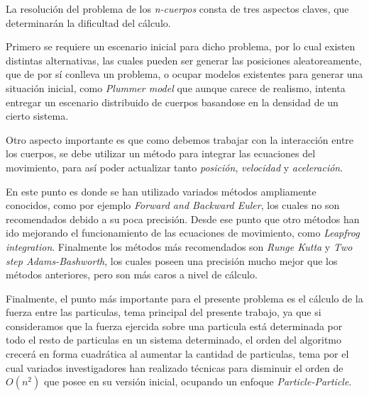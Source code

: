 
La resolución del problema de los \emph{n-cuerpos} consta de tres
aspectos claves, que determinarán la dificultad del cálculo.

Primero se requiere un escenario inicial para dicho problema,
por lo cual existen distintas alternativas, las cuales pueden ser
generar las posiciones aleatoreamente, que de por sí conlleva un problema,
o ocupar modelos existentes para generar una situación inicial,
como \emph{Plummer model} que aunque carece de realismo,
intenta entregar un escenario distribuido de cuerpos
basandose en la densidad de un cierto sistema.

Otro aspecto importante es que como debemos trabajar con la interacción
entre los cuerpos, se debe utilizar un método para integrar las ecuaciones
del movimiento, para así poder actualizar tanto \emph{posición}, \emph{velocidad}
y \emph{aceleración}. 

En este punto es donde se han utilizado variados métodos ampliamente conocidos,
como por ejemplo \emph{Forward and Backward Euler}, los cuales no son recomendados
debido a su poca precisión. Desde ese punto que otro métodos han ido mejorando
el funcionamiento de las ecuaciones de movimiento, como \emph{Leapfrog integration}.
Finalmente los métodos más recomendados son \emph{Runge Kutta} y \emph{Two step Adams-Bashworth},
los cuales poseen una precisión mucho mejor que los métodos anteriores, pero son
más caros a nivel de cálculo.

Finalmente, el punto más importante para el presente problema es el cálculo
de la fuerza entre las particulas, tema principal del presente trabajo,
ya que si consideramos que la fuerza ejercida sobre una particula está determinada
por todo el resto de particulas en un sistema determinado, el orden del algoritmo
crecerá en forma cuadrática al aumentar la cantidad de particulas,
tema por el cual variados investigadores han realizado técnicas para disminuir
el orden de $O(n^2)$ que posee en su versión inicial, ocupando un enfoque
\emph{Particle-Particle}.
